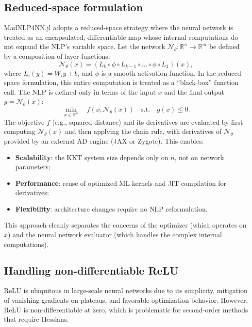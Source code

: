 \documentclass[11pt]{article}
\begin{document}
\subsection{Reduced-space formulation}
MadNLP4NN.jl adopts a reduced-space strategy where the neural network is treated as an encapsulated, differentiable map whose internal computations do not expand the NLP's variable space. Let the network $\mathcal{N}_\theta: \mathbb{R}^n \to \mathbb{R}^m$ be defined by a composition of layer functions:
\begin{equation}
  \mathcal{N}_\theta(x) = (L_k \circ \phi \circ L_{k-1} \circ \dots \circ \phi \circ L_1)(x),
\end{equation}
where $L_i(y) = W_i y + b_i$ and $\phi$ is a smooth activation function. In the reduced-space formulation, this entire computation is treated as a ``black-box'' function call. The NLP is defined only in terms of the input $x$ and the final output $y = \mathcal{N}_\theta(x)$:
\begin{equation}
  \min_{x \in \mathbb{R}^n} \quad f(x, \mathcal{N}_\theta(x)) \quad \text{s.t.} \quad g(x) \le 0.
\end{equation}
The objective $f$ (e.g., squared distance) and its derivatives are evaluated by first computing $\mathcal{N}_\theta(x)$ and then applying the chain rule, with derivatives of $\mathcal{N}_\theta$ provided by an external AD engine (JAX or Zygote). This enables:
\begin{itemize}[leftmargin=1.5em]
  \item \textbf{Scalability}: the KKT system size depends only on $n$, not on network parameters;
  \item \textbf{Performance}: reuse of optimized ML kernels and JIT compilation for derivatives;
  \item \textbf{Flexibility}: architecture changes require no NLP reformulation.
\end{itemize}
This approach cleanly separates the concerns of the optimizer (which operates on $x$) and the neural network evaluator (which handles the complex internal computations).

\subsection{Handling non-differentiable ReLU}
ReLU is ubiquitous in large-scale neural networks due to its simplicity, mitigation of vanishing gradients on plateaus, and favorable optimization behavior. However, ReLU is non-differentiable at zero, which is problematic for second-order methods that require Hessians.
\end{document}
